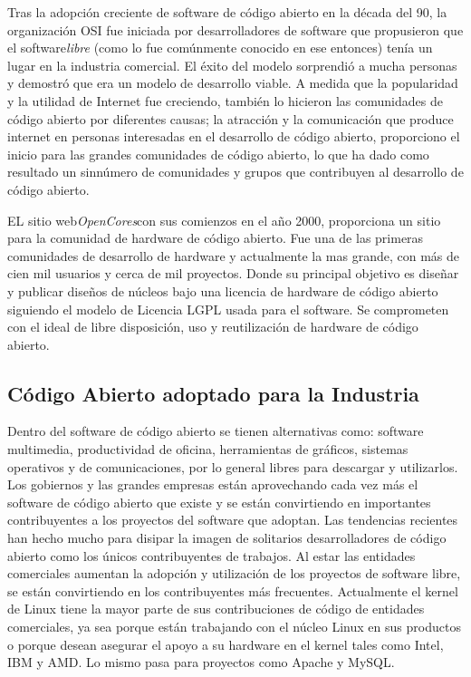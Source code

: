 	Tras la adopción creciente de software de código abierto en la década del 90, la organización OSI fue iniciada por desarrolladores de software que propusieron que el 					software\textit{libre} (como lo fue comúnmente conocido en ese entonces) tenía un lugar en la industria comercial. El éxito del modelo sorprendió a mucha personas y demostró 		que era un modelo de desarrollo viable. A medida que la popularidad y la utilidad de Internet fue creciendo, también lo hicieron las comunidades de código abierto por 					diferentes causas; la atracción y la comunicación que produce internet en personas interesadas en el desarrollo de código abierto, proporciono el inicio para las grandes
	comunidades de código abierto, lo que ha dado como resultado un sinnúmero de comunidades y grupos que contribuyen al desarrollo de código abierto.


	EL sitio web\textit{OpenCores}con sus comienzos en el año 2000, proporciona un sitio para la comunidad de hardware de código abierto.
 	Fue una de las primeras comunidades de desarrollo de hardware y actualmente la mas grande, con más de cien mil usuarios y cerca de mil proyectos. Donde su
	principal objetivo es diseñar y publicar diseños de núcleos bajo una licencia de hardware de código abierto siguiendo el modelo de Licencia LGPL usada para el software.
	Se comprometen con el ideal de libre disposición, uso y reutilización de hardware de código abierto.\cite{Etiqueta10}

	\subsection{Código Abierto adoptado para la Industria}

	Dentro del software de código abierto se tienen alternativas como: software multimedia, productividad de oficina, herramientas de
	gráficos, sistemas operativos y de comunicaciones, por lo general libres para descargar y utilizarlos. Los gobiernos y las grandes empresas están aprovechando cada 					vez más el software de código abierto que existe y se están convirtiendo en importantes contribuyentes a los proyectos del software que adoptan. Las tendencias recientes han 			hecho mucho para disipar la imagen de solitarios desarrolladores de código abierto como los únicos contribuyentes de trabajos.
	Al estar las entidades comerciales aumentan la adopción y utilización de los proyectos de software libre,  se están convirtiendo en los contribuyentes más frecuentes. 					Actualmente el kernel de Linux tiene la mayor parte de sus contribuciones de código de entidades comerciales, ya sea porque están trabajando con el núcleo Linux en sus 				productos o porque desean asegurar el apoyo a su hardware en el kernel tales como Intel,  IBM y AMD. Lo mismo pasa para proyectos como Apache y MySQL.


